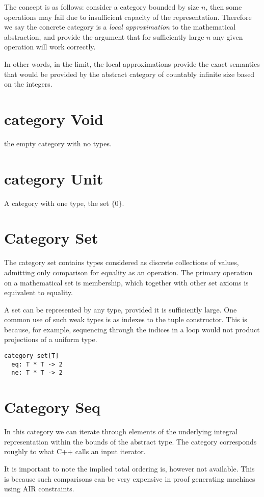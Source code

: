 The concept is as follows: consider a category bounded by size $n$,
then some operations may fail due to insufficient capacity of
the representation. Therefore we say the concrete category is 
a {\em local approximation} to the mathematical abstraction,
and provide the argument that for sufficiently large $n$ any
given operation will work correctly.

In other words, in the limit, the local approximations provide
the exact semantics that would be provided by the abstract category
of countably infinite size based on the integers.

\section{category Void}
the empty category with no types.

\section{category Unit}
A category with one type, the set $\{0\}$.

\section{Category Set}
The category set contains types considered as discrete collections
of values, admitting only comparison for equality as an operation.
The primary operation on a mathematical set is membership, which together
with other set axioms is equivalent to equality.

A set can be represented by any type, provided it is sufficiently large.
One common use of such weak types is as indexes to the tuple constructor.
This is because, for example, sequencing through the indices in a loop
would not product projections of a uniform type.

\begin{verbatim}
category set[T]
  eq: T * T -> 2
  ne: T * T -> 2
\end{verbatim}

\section{Category Seq}
In this category we can iterate through elements of the underlying
integral representation within the bounds of the abstract type.
The category corresponds roughly to what C++ calls an input iterator.

It is important to note the implied total ordering is, however
not available. This is because such comparisons can be very
expensive in proof generating machines using AIR constraints.

